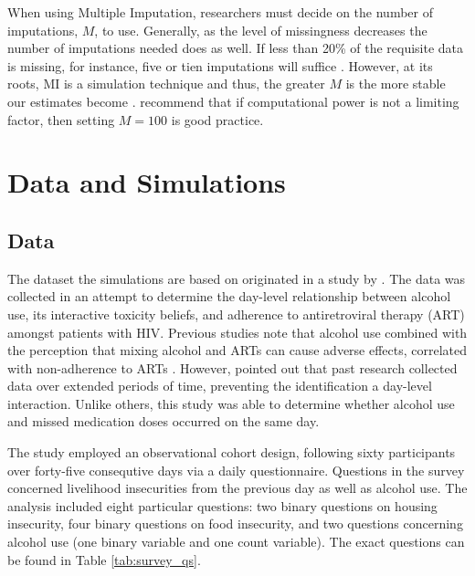 \documentclass{svjour3}\usepackage[]{graphicx}\usepackage[]{color}
\begin{document}
When using Multiple Imputation, researchers must decide on the number of imputations, $M$, to use. Generally, as the level of missingness decreases the number of imputations needed does as well. If less than 20\% of the requisite data is missing, for instance, five or tien imputations will suffice \citep{raghunathan2015missing}. However, at its roots, MI is a simulation technique and thus, the greater $M$ is the more stable our estimates become \citep{harel2007inferences}. \citet{graham2007many} recommend that if computational power is not a limiting factor, then setting $M=100$ is good practice. \par

\section{Data and Simulations}
\label{sec:2}
\subsection{Data}
\label{sec:2.1}
The dataset the simulations are based on originated in a study by \citet{pellowski2016alcohol}. The data was collected in an attempt to determine the day-level relationship between alcohol use, its interactive toxicity beliefs, and adherence to antiretroviral therapy (ART) amongst patients with HIV. Previous studies note that alcohol use combined with the perception that mixing alcohol and ARTs can cause adverse effects, correlated with non-adherence to ARTs \citep{kalichman2009prevalence, kalichman2012alcohol}. However, \citet{pellowski2016alcohol} pointed out that past research collected data over extended periods of time, preventing the identification a day-level interaction. Unlike others, this study was able to determine whether alcohol use and missed medication doses occurred on the same day. \par

The study employed an observational cohort design, following sixty participants over forty-five consequtive days via a daily questionnaire. Questions in the survey concerned livelihood insecurities from the previous day as well as alcohol use. The analysis included eight particular questions: two binary questions on housing insecurity, four binary questions on food insecurity, and two questions concerning alcohol use (one binary variable and one count variable). The exact questions can be found in Table \ref{tab:survey_qs}. \par
\end{document}
